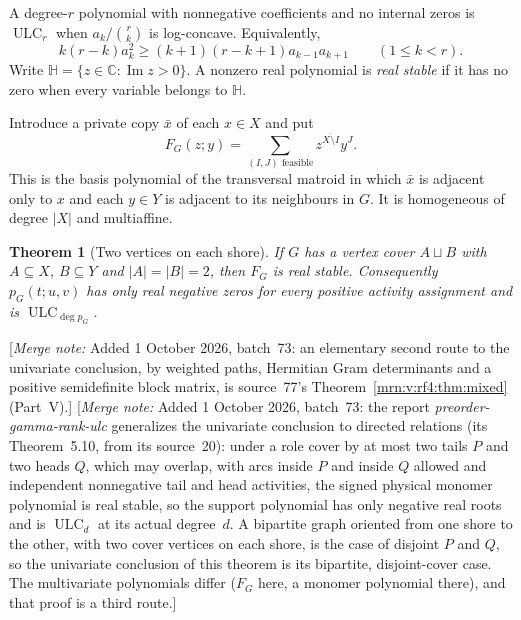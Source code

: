 \documentclass[11pt,a4paper]{article}
\newtheorem{theorem}{Theorem}[section]
\theoremstyle{remark}\newtheorem{remark}[theorem]{Remark}
\newcommand{\ULC}{\operatorname{ULC}}      %
\newcommand{\HH}{\mathbb H}                %
\newcommand{\mnote}[1]{[\textit{Merge note:} #1]}
\begin{document}
A degree-$r$ polynomial with nonnegative coefficients and no internal zeros is $\ULC_r$ when $a_k/\binom rk$ is log-concave. Equivalently,
\begin{equation}\label{mrn:w:sb:eq:ulc}
 k(r-k)a_k^2\ge(k+1)(r-k+1)a_{k-1}a_{k+1}
 \qquad(1\le k<r).
\end{equation}
Write $\HH=\{z\in\mathbb C:\operatorname{Im}z>0\}$. A nonzero real polynomial is \emph{real stable} if it has no zero when every variable belongs to $\HH$.

Introduce a private copy $\bar x$ of each $x\in X$ and put
\begin{equation}\label{mrn:w:sb:eq:basis}
 F_G(z;y)=\sum_{(I,J)\text{ feasible}}z^{\overline{X\setminus I}}y^J.
\end{equation}
This is the basis polynomial of the transversal matroid in which $\bar x$ is adjacent only to $x$ and each $y\in Y$ is adjacent to its neighbours in $G$. It is homogeneous of degree $|X|$ and multiaffine.

\begin{theorem}[Two vertices on each shore]\label{mrn:w:sb:thm:main}
If $G$ has a vertex cover $A\sqcup B$ with $A\subseteq X$, $B\subseteq Y$ and $|A|=|B|=2$, then $F_G$ is real stable. Consequently $p_G(t;u,v)$ has only real negative zeros for every positive activity assignment and is $\ULC_{\deg p_G}$.
\end{theorem}
\mnote{Added 1 October 2026, batch~73: an elementary second route to the
univariate conclusion, by weighted paths, Hermitian Gram determinants and a
positive semidefinite block matrix, is source~77's
Theorem~\ref{mrn:v:rf4:thm:mixed} (Part~V).}
\mnote{Added 1 October 2026, batch~73: the report \emph{preorder-gamma-rank-ulc}
generalizes the univariate conclusion to directed relations (its
Theorem~5.10, from its source~20): under a role cover by at most two tails
$P$ and two heads $Q$, which may overlap, with arcs inside $P$ and inside
$Q$ allowed and independent nonnegative tail and head activities, the
signed physical monomer polynomial is real stable, so the support
polynomial has only negative real roots and is $\ULC_d$ at its actual
degree~$d$. A bipartite graph oriented from one shore to the other, with two
cover vertices on each shore, is the case of disjoint $P$ and $Q$, so the
univariate conclusion of this theorem is its bipartite, disjoint-cover
case. The multivariate polynomials differ ($F_G$ here, a monomer
polynomial there), and that proof is a third route.}
\end{document}
